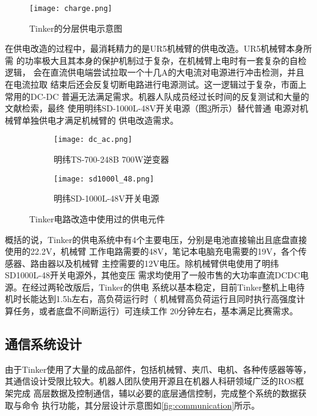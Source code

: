 \begin{figure}[ht] %
  \centering
  \texttt{[image: charge.png]}
  \caption{Tinker的分层供电示意图}
  \label{fig:charge}
\end{figure}

在供电改造的过程中，最消耗精力的是UR5机械臂的供电改造。UR5机械臂本身所需
的功率极大且其本身的保护机制过于复杂，在机械臂上电时有一套复杂的自检逻辑，
会在直流供电端尝试拉取一个十几A的大电流对电源进行冲击检测，并且在电流拉取
结束后还会反复切断电路进行电源测试。这一逻辑过于复杂，市面上常用的DC-DC
普遍无法满足需求。机器人队成员经过长时间的反复测试和大量的文献检索，最终
使用明纬SD-1000L-48V开关电源（图\ref{fig:sd1000l_48}所示）替代普通
电源对机械臂单独供电才满足机械臂的
供电改造需求。

\begin{figure}
\centering
\begin{subfigure}{.5\textwidth}
  \centering
  \texttt{[image: dc\_ac.png]}
  \caption{明纬TS-700-248B 700W逆变器}
  \label{fig:dc_ac}
\end{subfigure}%
\begin{subfigure}{.5\textwidth}
  \centering
  \texttt{[image: sd1000l\_48.png]}
  \caption{明纬SD-1000L-48V开关电源}
  \label{fig:sd1000l_48}
\end{subfigure}
\caption{Tinker电路改造中使用过的供电元件}
\label{fig:charge_hareware}
\end{figure}

概括的说，Tinker的供电系统中有4个主要电压，分别是电池直接输出且底盘直接
使用的22.2V，机械臂
工作电路需要的48V，笔记本电脑充电需要的19V，各个传感器、路由器以及机械臂
主控需要的12V电压。除机械臂供电使用了明纬SD1000L-48开关电源外，其他变压
需求均使用了一般市售的大功率直流DCDC电源。在经过两轮改版后，Tinker的供电
系统以基本稳定，目前Tinker整机上电待机时长能达到1.5h左右，高负荷运行时（
机械臂高负荷运行且同时执行高强度计算任务，或者底盘不间断运行）可连续工作
20分钟左右，基本满足比赛需求。

\subsection{通信系统设计}

由于Tinker使用了大量的成品部件，包括机械臂、夹爪、电机、各种传感器等等，
其通信设计受限比较大。机器人团队使用开源且在机器人科研领域广泛的ROS框架完成
高层数据及控制通信，辅以必要的底层通信控制，完成整个系统的数据获取与命令
执行功能，其分层设计示意图如\ref{fig:communication}所示。

